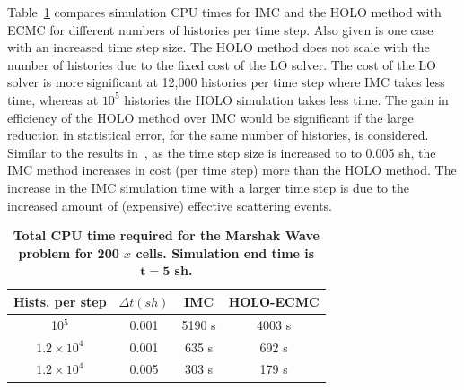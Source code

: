 \documentclass{mc2013}
\begin{document}
Table~\ref{marshak_table} compares simulation CPU times for IMC and the HOLO method
with ECMC for different numbers of histories per time step.  Also given is one case
with an increased time step size.   The HOLO method does not scale with the number of
histories due to the fixed cost of the LO solver.  The cost of the LO solver is more
significant at 12,000 histories per time step where IMC takes less time, whereas at
$10^5$ histories the HOLO simulation takes less time.    The gain in efficiency of
the HOLO method over IMC would be significant if the large reduction in statistical
error, for the same number of histories, is considered.  Similar to the results
in~\cite{park}, as the time step size is increased to to 0.005 sh, the IMC method
increases in cost (per time step) more than the HOLO method. The increase in the IMC
simulation time with a larger time step is due to the increased amount of (expensive) effective scattering
events.   
\begin{table}[H]
\centering
\caption{\label{marshak_table} \textbf{Total CPU time required for the Marshak Wave problem for 200 $x$ cells.  Simulation end time is $\mathbf{t=5}$ sh.}}
\vspace{-0.1in}
	\begin{tabular}{|c|c|c|c|}\hline
Hists. per step & $\Delta t (sh)$ & IMC & HOLO-ECMC \\ \hline
10$^5$                    &   0.001	& 5190 s &	4003 s\\
$1.2\times10^4 $   &    0.001	& 635   s &	692 s \\
$1.2\times10^4$     &   0.005	& 303	  s &    179 s \\ \hline
\end{tabular}
\end{table}


\end{document}
